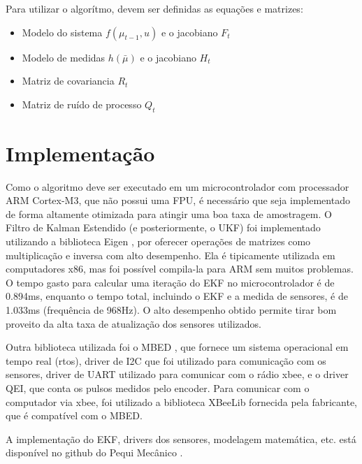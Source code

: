 \documentclass[
	12pt,				%
	openright,			%
	twoside,			%
	convert,
	a4paper,			%
	english,			%
	french,				%
	spanish,			%
	brazil				%
	]{abntex2}
\begin{document}
Para utilizar o algorítmo, devem ser definidas as equações e matrizes:
\begin{itemize}
	\item Modelo do sistema $f(\mu _{t-1}, u)$ e o jacobiano $F_t$
	\item Modelo de medidas $h(\bar{\mu})$ e o jacobiano $H_t$
	\item Matriz de covariancia $R_t$
	\item Matriz de ruído de processo $Q_t$
\end{itemize}

\section{Implementação}
Como o algoritmo deve ser executado em um microcontrolador com processador ARM Cortex-M3, que não possui uma FPU, é necessário que seja implementado de forma altamente otimizada para atingir uma boa taxa de amostragem. O Filtro de Kalman Estendido (e posteriormente, o UKF) foi implementado utilizando a biblioteca Eigen \cite{eigen}, por oferecer operações de matrizes como multiplicação e inversa com alto desempenho. Ela é tipicamente utilizada em computadores x86, mas foi possível compila-la para ARM sem muitos problemas. O tempo gasto para calcular uma iteração do EKF no microcontrolador é de 0.894ms, enquanto o tempo total, incluindo o EKF e a medida de sensores, é de 1.033ms (frequência de 968Hz). O alto desempenho obtido permite tirar bom proveito da alta taxa de atualização dos sensores utilizados.
\par
Outra biblioteca utilizada foi o MBED \cite{mbed}, que fornece um sistema operacional em tempo real (rtos), driver de I2C que foi utilizado para comunicação com os sensores, driver de UART utilizado para comunicar com o rádio xbee, e o driver QEI, que conta os pulsos medidos pelo encoder. Para comunicar com o computador via xbee, foi utilizado a biblioteca XBeeLib \cite{xbeelib} fornecida pela fabricante, que é compatível com o MBED.
\par
A implementação do EKF, drivers dos sensores, modelagem matemática, etc. está disponível no github do Pequi Mecânico \cite{vsss_robot}.
\end{document}
